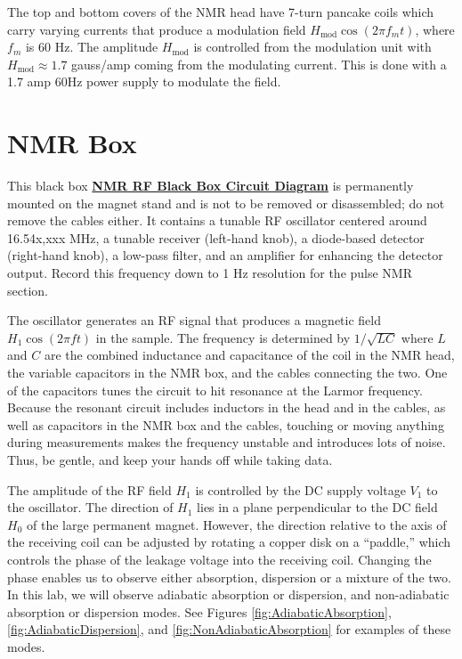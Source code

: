 \documentclass{../lab}
\begin{document}
The top and bottom covers of the NMR head have 7-turn pancake coils which carry varying currents that produce a modulation field $H_\text{mod} \cos(2 \pi f_m t)$, where $f_m$ is 60 Hz. The amplitude $H_\text{mod}$ is controlled from the modulation unit with $H_\text{mod} \approx 1.7$ gauss/amp coming from the modulating current. This is done with a 1.7 amp 60Hz power supply to modulate the field.

\section{NMR Box}

This black box \href{http://experimentationlab.berkeley.edu/sites/default/files/images/NMR31.gif}{\textbf{NMR RF Black Box Circuit Diagram}}
is permanently mounted on the magnet stand and is not to be removed or disassembled; do not remove the cables either. It contains a tunable RF oscillator centered around 16.54x,xxx MHz, a tunable receiver (left-hand knob), a diode-based detector (right-hand knob), a low-pass filter, and an amplifier for enhancing the detector output. Record this frequency down to 1 Hz resolution for the pulse NMR section.

The oscillator generates an RF signal that produces a magnetic field $H_1\cos(2\pi f t)$ in the sample. The frequency is determined by $1/\sqrt{LC}$ where $L$ and $C$ are the combined inductance and capacitance of the coil in the NMR head, the variable capacitors in the NMR box, and the cables connecting the two. One of the capacitors tunes the circuit to hit resonance at the Larmor frequency. Because the resonant circuit includes inductors in the head and in the cables, as well as capacitors in the NMR box and the cables, touching or moving anything during measurements makes the frequency unstable and introduces lots of noise. Thus, be gentle, and keep your hands off while taking data.

The amplitude of the RF field $H_1$ is controlled by the DC supply voltage $V_1$ to the oscillator. The direction of $H_1$ lies in a plane perpendicular to the DC field $H_0$ of the large permanent magnet. However, the direction relative to the axis of the receiving coil can be adjusted by rotating a copper disk on a ``paddle,'' which controls the phase of the leakage voltage into the receiving coil. Changing the phase enables us to observe either absorption, dispersion or a mixture of the two. In this lab, we will observe adiabatic absorption or dispersion, and non-adiabatic absorption or dispersion modes. See Figures \ref{fig:AdiabaticAbsorption}, \ref{fig:AdiabaticDispersion}, and \ref{fig:NonAdiabaticAbsorption} for examples of these modes.
\end{document}
